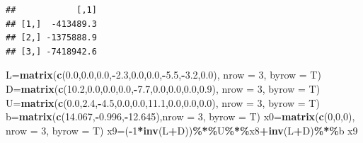 \documentclass[
]{article}
\newenvironment{Shaded}{\begin{snugshade}}{\end{snugshade}}
\newcommand{\AttributeTok}[1]{\textcolor[rgb]{0.13,0.29,0.53}{#1}}
\newcommand{\DecValTok}[1]{\textcolor[rgb]{0.00,0.00,0.81}{#1}}
\newcommand{\FloatTok}[1]{\textcolor[rgb]{0.00,0.00,0.81}{#1}}
\newcommand{\FunctionTok}[1]{\textcolor[rgb]{0.13,0.29,0.53}{\textbf{#1}}}
\newcommand{\NormalTok}[1]{#1}
\newcommand{\OtherTok}[1]{\textcolor[rgb]{0.56,0.35,0.01}{#1}}
\newcommand{\SpecialCharTok}[1]{\textcolor[rgb]{0.81,0.36,0.00}{\textbf{#1}}}
\begin{document}
\begin{verbatim}
##            [,1]
## [1,]  -413489.3
## [2,] -1375888.9
## [3,] -7418942.6
\end{verbatim}

\begin{Shaded}
\begin{Highlighting}[]
\NormalTok{  L}\OtherTok{=}\FunctionTok{matrix}\NormalTok{(}\FunctionTok{c}\NormalTok{(}\FloatTok{0.0}\NormalTok{,}\FloatTok{0.0}\NormalTok{,}\FloatTok{0.0}\NormalTok{,}\SpecialCharTok{{-}}\FloatTok{2.3}\NormalTok{,}\FloatTok{0.0}\NormalTok{,}\FloatTok{0.0}\NormalTok{,}\SpecialCharTok{{-}}\FloatTok{5.5}\NormalTok{,}\SpecialCharTok{{-}}\FloatTok{3.2}\NormalTok{,}\FloatTok{0.0}\NormalTok{), }\AttributeTok{nrow =} \DecValTok{3}\NormalTok{, }\AttributeTok{byrow =}\NormalTok{ T)}
\NormalTok{  D}\OtherTok{=}\FunctionTok{matrix}\NormalTok{(}\FunctionTok{c}\NormalTok{(}\FloatTok{10.2}\NormalTok{,}\FloatTok{0.0}\NormalTok{,}\FloatTok{0.0}\NormalTok{,}\FloatTok{0.0}\NormalTok{,}\SpecialCharTok{{-}}\FloatTok{7.7}\NormalTok{,}\FloatTok{0.0}\NormalTok{,}\FloatTok{0.0}\NormalTok{,}\FloatTok{0.0}\NormalTok{,}\FloatTok{0.9}\NormalTok{), }\AttributeTok{nrow =} \DecValTok{3}\NormalTok{, }\AttributeTok{byrow =}\NormalTok{ T)}
\NormalTok{  U}\OtherTok{=}\FunctionTok{matrix}\NormalTok{(}\FunctionTok{c}\NormalTok{(}\FloatTok{0.0}\NormalTok{,}\FloatTok{2.4}\NormalTok{,}\SpecialCharTok{{-}}\FloatTok{4.5}\NormalTok{,}\FloatTok{0.0}\NormalTok{,}\FloatTok{0.0}\NormalTok{,}\FloatTok{11.1}\NormalTok{,}\FloatTok{0.0}\NormalTok{,}\FloatTok{0.0}\NormalTok{,}\FloatTok{0.0}\NormalTok{), }\AttributeTok{nrow =} \DecValTok{3}\NormalTok{, }\AttributeTok{byrow =}\NormalTok{ T)}
\NormalTok{  b}\OtherTok{=}\FunctionTok{matrix}\NormalTok{(}\FunctionTok{c}\NormalTok{(}\FloatTok{14.067}\NormalTok{,}\SpecialCharTok{{-}}\FloatTok{0.996}\NormalTok{,}\SpecialCharTok{{-}}\FloatTok{12.645}\NormalTok{),}\AttributeTok{nrow =} \DecValTok{3}\NormalTok{, }\AttributeTok{byrow =}\NormalTok{ T)}
\NormalTok{  x0}\OtherTok{=}\FunctionTok{matrix}\NormalTok{(}\FunctionTok{c}\NormalTok{(}\DecValTok{0}\NormalTok{,}\DecValTok{0}\NormalTok{,}\DecValTok{0}\NormalTok{), }\AttributeTok{nrow =} \DecValTok{3}\NormalTok{, }\AttributeTok{byrow =}\NormalTok{ T)}
\NormalTok{  x9}\OtherTok{=}\NormalTok{(}\SpecialCharTok{{-}}\DecValTok{1}\SpecialCharTok{*}\FunctionTok{inv}\NormalTok{(L}\SpecialCharTok{+}\NormalTok{D))}\SpecialCharTok{\%*\%}\NormalTok{U}\SpecialCharTok{\%*\%}\NormalTok{x8}\SpecialCharTok{+}\FunctionTok{inv}\NormalTok{(L}\SpecialCharTok{+}\NormalTok{D)}\SpecialCharTok{\%*\%}\NormalTok{b}
\NormalTok{  x9}
\end{Highlighting}
\end{Shaded}
\end{document}
